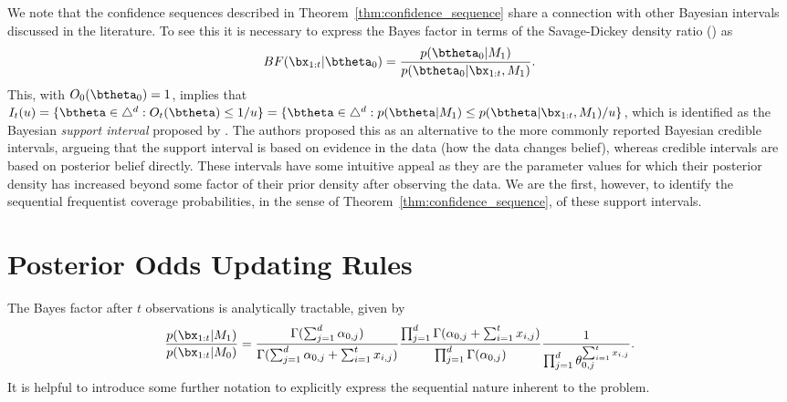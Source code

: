 \documentclass[11pt]{article}
\begin{document}
We note that the confidence sequences described in Theorem~\ref{thm:confidence_sequence} share a connection with other Bayesian intervals discussed in the literature.
To see this it is necessary to express the Bayes factor in terms of the Savage-Dickey density ratio (\cite{dickey}) as
\begin{equation}
    BF(\bx_{1:t}|\btheta_0) = \frac{p(\btheta_0| M_1)}{p(\btheta_0|\bx_{1:t},M_1)}.
\end{equation}
This, with $O_0(\btheta_0)=1$, implies that $I_t(u) = \lbrace \btheta \in \triangle^d : O_t(\btheta) \leq 1/u \rbrace = \lbrace \btheta  \in \triangle^d : p(\btheta| M_1)\leq p(\btheta|\bx_{1:t}, M_1)/u \rbrace $, which is identified as the Bayesian \textit{support interval} proposed by \cite{support_interval}.
The authors proposed this as an alternative to the more commonly reported Bayesian credible intervals, argueing that the support interval is based on evidence in the data (how the data changes belief), whereas credible intervals are based on posterior belief directly.
These intervals have some intuitive appeal as they are the parameter values for which their posterior density has increased beyond some factor of their prior density after observing the data.
We are the first, however, to identify the sequential frequentist coverage probabilities, in the sense of Theorem~\ref{thm:confidence_sequence}, of these support intervals.






\appendix
\section{Posterior Odds Updating Rules}
\label{app:posterior_odds}
The Bayes factor after $t$ observations is analytically tractable, given by
\begin{equation}
  \label{eq:bayes_factor}
 \frac{p(\bx_{1:t}|M_1)}{p(\bx_{1:t}|M_0)} = \frac{\Gamma(\sum_{j=1}^{d} \alpha_{0,j})}{\Gamma(\sum_{j=1}^{d} \alpha_{0,j} + \sum_{i=1}^{t}x_{i,j})}\frac{\prod_{j=1}^{d}\Gamma(\alpha_{0,j} + \sum_{i=1}^{t}x_{i,j} )}{\prod_{j=1}^{d}\Gamma(\alpha_{0,j} )}\frac{1}{\prod_{j=1}^{d} \theta_{0,j}^{\sum_{i=1}^{t}x_{i,j}}}.
\end{equation}
It is helpful to introduce some further notation to explicitly express the sequential nature inherent to the problem.
\end{document}
